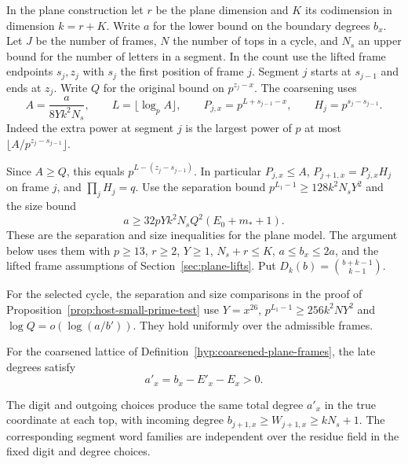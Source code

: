 \begin{paramdefinition}\label{hyp:coarsened-plane-frames}\label{par:plane-rank}
\hypertarget{source-plane-rank}{}
In the plane construction let \(r\) be the plane dimension and \(K\) its codimension in dimension \(k=r+K\). Write \(a\) for the lower bound on the boundary degrees \(b_x\).
Let \(J\) be the number of frames, \(N\) the number of tops in a
cycle, and \(N_s\) an upper bound for the number of letters in a
segment. In the count use the lifted frame endpoints \(s_j,z_j\)
with \(s_j\) the first position of frame \(j\). Segment \(j\)
starts at \(s_{j-1}\) and ends at \(z_j\). Write \(Q\) for the
original bound on \(p^{z_j-x}\). The coarsening uses
\[
 A=\frac{a}{8Yk^2N_s},\qquad L=\lfloor\log_p A\rfloor,\qquad
 P_{j,x}=p^{L+s_{j-1}-x},\qquad H_j=p^{s_j-s_{j-1}}.
\]
Indeed the extra power at segment \(j\) is the largest power of
\(p\) at most \(\lfloor A/p^{z_j-s_{j-1}}\rfloor\).

Since \(A\ge Q\),
this equals \(p^{L-(z_j-s_{j-1})}\). In particular \(P_{j,x}\le A\),
\(P_{j+1,x}=P_{j,x}H_j\) on frame \(j\), and \(\prod_j H_j=q\).
Use the separation bound \(p^{L_1-1}\ge128 k^2N_sY^2\) and the
size bound
\begin{equation}\label{eq:plane-count-size}
  a\ge32pYk^2N_sQ^2(E_0+m_*+1).
\end{equation}
These are the separation and size inequalities for the plane model.
The argument below uses them with \(p\ge13\), \(r\ge2\),
\(Y\ge1\), \(N_s+r\le K\), \(a\le b_x\le 2a\), and the lifted
frame assumptions of Section~\ref{sec:plane-lifts}.
Put \(D_k(b)=\binom{b+k-1}{k-1}\).
\end{paramdefinition}
For the selected cycle, the separation and size comparisons in the proof of Proposition~\ref{prop:host-small-prime-test} use \(Y=x^{26}\), \(p^{L_1-1}\ge256k^2NY^2\) and \(\log Q=o(\log(a/b'))\). They hold uniformly over the admissible frames.


\begin{lemma}\label{lem:plane-digit-frame-lattice}
For the coarsened lattice of Definition~\ref{hyp:coarsened-plane-frames},
the late degrees satisfy
\[
 a'_x=b_x-E'_x-E_x>0.
\]

The digit and outgoing choices produce the same total degree
\(a'_x\) in the true coordinate at each top, with incoming
degree \(b_{j+1,x}\ge W_{j+1,x}\ge kN_s+1\).
The corresponding segment word families are independent over
the residue field in the fixed digit and degree choices.
\end{lemma}

